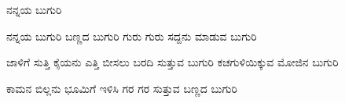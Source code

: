 \documentclass[main.tex]{subfiles}
\begin{document}
{\Huge {ನನ್ನಯ ಬುಗುರಿ}
\large
\begin{poem}
  \raggedleft
  \begin{stanza}
   ನನ್ನಯ ಬುಗುರಿ ಬಣ್ಣದ ಬುಗುರಿ \verseline
   ಗುರು ಗುರು ಸದ್ದನು ಮಾಡುವ ಬುಗುರಿ
  \end{stanza}
  \begin{stanza}
   ಜಾಳಿಗೆ ಸುತ್ತಿ ಕೈಯನು ಎತ್ತಿ \verseline
   ಬೀಸಲು ಬರದಿ ಸುತ್ತುವ ಬುಗುರಿ \verseline
   ಕಚಗುಳಿಯಿಕ್ಕುವ ಮೋಜಿನ ಬುಗುರಿ
  \end{stanza}
  \begin{stanza}
   ಕಾಮನ ಬಿಲ್ಲನು ಭೂಮಿಗೆ ಇಳಿಸಿ \verseline
   ಗರ ಗರ ಸುತ್ತುವ ಬಣ್ಣದ ಬುಗುರಿ
  \end{stanza}
\end{poem}
\raggedleft

}
\end{document}
